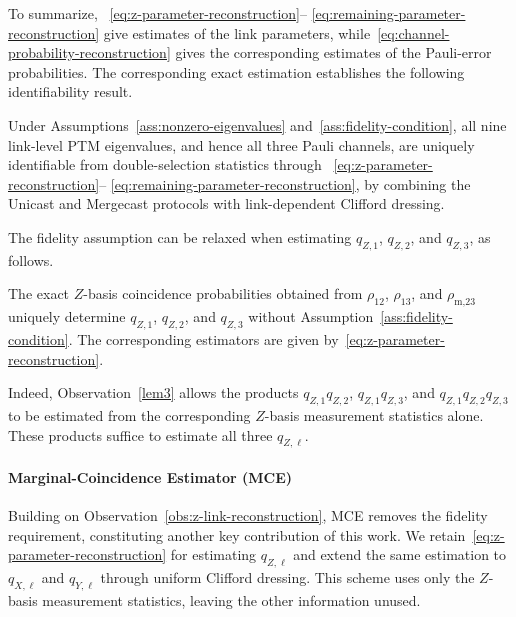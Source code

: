 To summarize, ~\eqref{eq:z-parameter-reconstruction}--%
\eqref{eq:remaining-parameter-reconstruction} give estimates
of the link parameters, while~\eqref{eq:channel-probability-reconstruction} gives the
corresponding estimates of the Pauli-error probabilities.
The corresponding exact estimation establishes the
following identifiability result.

\begin{theorem}
\label{cor:three-link-identifiability}
Under Assumptions~\ref{ass:nonzero-eigenvalues}
and~\ref{ass:fidelity-condition}, all nine link-level PTM
eigenvalues, and hence all three Pauli channels, are uniquely
identifiable from double-selection statistics through
~\eqref{eq:z-parameter-reconstruction}--%
\eqref{eq:remaining-parameter-reconstruction}, by combining
the Unicast{} and Mergecast{} protocols with link-dependent
Clifford dressing.
\end{theorem}

The fidelity assumption can be relaxed when estimating
$q_{Z,1}$, $q_{Z,2}$, and $q_{Z,3}$, as follows.

\begin{observation}
\label{obs:z-link-reconstruction}
The exact
$Z$-basis coincidence probabilities obtained from
$\rho_{12}$, $\rho_{13}$, and $\rho_{\text{m,}23}$ uniquely
determine $q_{Z,1}$, $q_{Z,2}$, and $q_{Z,3}$ without
Assumption~\ref{ass:fidelity-condition}.
The corresponding estimators are given by~\eqref{eq:z-parameter-reconstruction}.
\end{observation}

Indeed, Observation~\ref{lem3} allows the products
$q_{Z,1}q_{Z,2}$, $q_{Z,1}q_{Z,3}$, and
$q_{Z,1}q_{Z,2}q_{Z,3}$ to be estimated from the
corresponding $Z$-basis measurement statistics alone.
These products suffice to estimate all three $q_{Z,\ell}$.

\paragraph{Marginal-Coincidence Estimator (MCE)}
Building on Observation~\ref{obs:z-link-reconstruction},
MCE removes the
fidelity requirement, constituting another key contribution of this work.
We retain~\eqref{eq:z-parameter-reconstruction} for
estimating $q_{Z,\ell}$ and extend the same estimation
to $q_{X,\ell}$ and $q_{Y,\ell}$ through uniform Clifford dressing.
This scheme uses only the $Z$-basis measurement statistics, leaving the other
information unused.

